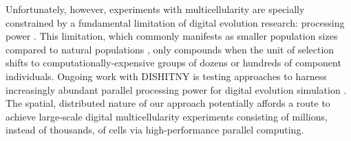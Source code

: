 Unfortunately, however, experiments with multicellularity are specially constrained by a fundamental limitation of digital evolution research: processing power \citep{Moreno_2020}.
This limitation, which commonly manifests as smaller population sizes compared to natural populations \citep{liard2018complexity}, only compounds when the unit of selection shifts to computationally-expensive groups of dozens or hundreds of component individuals.
Ongoing work with DISHITNY is testing approaches to harness increasingly abundant parallel processing power for digital evolution simulation \citep{moreno2021conduit}.
The spatial, distributed nature of our approach potentially affords a route to achieve large-scale digital multicellularity experiments consisting of millions, instead of thousands, of cells via high-performance parallel computing.
